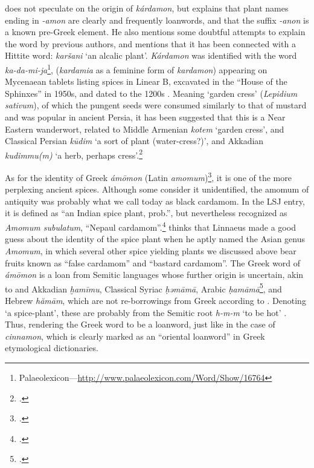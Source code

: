 \textcite[644]{beekes_etymological_2010} does not speculate on the origin of \textit{kárdamon}, but explains that plant names ending in \textit{-amon} are clearly and frequently loanwords, and that the suffix \textit{-anon} is a known pre-Greek element. He also mentions some doubtful attempts to explain the word by previous authors, and mentions that it has been connected with a Hittite word: \textit{karšani} `an alcalic plant'. \textit{Kárdamon} was identified with the word \lb{\KADAMIJA} \textit{ka-da-mi-ja}\footnote{Palaeolexicon---\url{http://www.palaeolexicon.com/Word/Show/16764}}, (\textit{kardamia} as a feminine form of \textit{kardamon}) appearing on Mycenaean tablets listing spices in Linear B, excavated in the ``House of the Sphinxes'' in 1950s, and dated to the 1200s \BC{} \autocite[107]{bennett_mycenae_1958}. Meaning `garden cress' (\textit{Lepidium sativum}), of which the pungent seeds were consumed similarly to that of mustard and was popular in ancient Persia, it has been suggested that this is a Near Eastern \gls{wanderwort}, related to Middle Armenian  \textit{kotem} `garden cress', and Classical Persian  \textit{kūdim} `a sort of plant (water-cress?)', and Akkadian \textit{kudimmu(m)} `a herb, perhaps cress'.\footcites[cf.][p. 371 ]{kouyoumdjian_comprehensive_1970}[]{asatrian_marginal_2012}[L14]{black_concise_2000}



As for the identity of Greek \textit{ámōmon} (Latin \textit{amomum})\footcite[amomum]{lewis_latin_1879}, it is one of the more perplexing ancient spices. Although some consider it unidentified, the amomum of antiquity was probably what we call today as black cardamom. In the \gls{LSJ} entry, it is defined as ``an Indian spice plant, prob.'', but nevertheless recognized as \textit{Amomum subulatum}, ``Nepaul cardamom''.\footcite[ἄμωμον]{liddell_greek-english_1940} \textcite[103]{dalby_dangerous_2000} thinks that Linnaeus made a good guess about the identity of the spice plant when he aptly named the Asian genus \textit{Amomum}, in which several other spice yielding plants we discussed above bear fruits known as ``false cardamom'' and ``bastard cardamom''. The Greek word of \textit{ámōmon} is a loan from Semitic languages whose further origin is uncertain, akin to and Akkadian \textit{ḫamīmu}, Classical Syriac  \textit{ḥəmāmā}, Arabic  \textit{ḥamāmā}\footcites[cf.][vol. 6, p. 66]{roth_assyrian_2004} [cardamom ]{ahd}[169]{low_aramaeische_1881}[100]{lev_practical_2008}, and Hebrew  
\textit{hămām}, which are not re-borrowings from Greek according to \textcite[123]{low_aramaeische_1881}. Denoting `a spice-plant', these are probably from the Semitic root \textit{h-m-m} `to be hot' \autocite[222]{klein_comprehensive_1987}. Thus, rendering the Greek word to be a loanword, just like in the case of \textit{cinnamon}, which is clearly marked as an ``oriental loanword'' in Greek etymological dictionaries.

